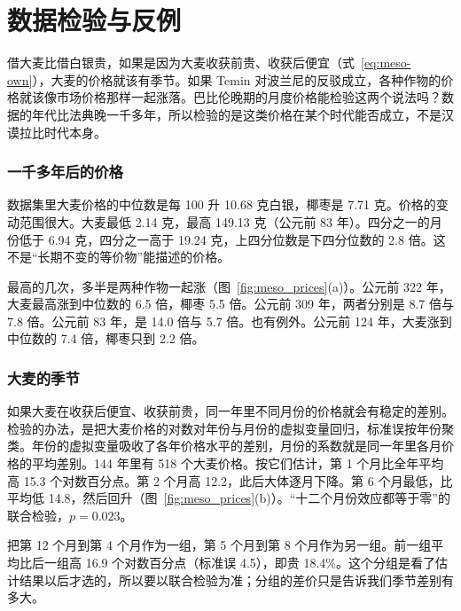 \section{数据检验与反例}\label{sec:meso-test}

借大麦比借白银贵，如果是因为大麦收获前贵、收获后便宜（式~\eqref{eq:meso-own}），大麦的价格就该有季节。如果 Temin 对波兰尼的反驳成立，各种作物的价格就该像市场价格那样一起涨落。巴比伦晚期的月度价格能检验这两个说法吗？数据的年代比法典晚一千多年，所以检验的是这类价格在某个时代能否成立，不是汉谟拉比时代本身。

\subsubsection{一千多年后的价格}
数据集里大麦价格的中位数是每 100 升 10.68 克白银，椰枣是 7.71 克。价格的变动范围很大。大麦最低 2.14 克，最高 149.13 克（公元前 83 年）。四分之一的月份低于 6.94 克，四分之一高于 19.24 克，上四分位数是下四分位数的 2.8 倍\cite{vdspek2014}。这不是“长期不变的等价物”能描述的价格。

最高的几次，多半是两种作物一起涨（图~\ref{fig:meso_prices}(a)）。公元前 322 年，大麦最高涨到中位数的 6.5 倍，椰枣 5.5 倍。公元前 309 年，两者分别是 8.7 倍与 7.8 倍。公元前 83 年，是 14.0 倍与 5.7 倍。也有例外。公元前 124 年，大麦涨到中位数的 7.4 倍，椰枣只到 2.2 倍。

\subsubsection{大麦的季节}
如果大麦在收获后便宜、收获前贵，同一年里不同月份的价格就会有稳定的差别。检验的办法，是把大麦价格的对数对年份与月份的虚拟变量回归，标准误按年份聚类。年份的虚拟变量吸收了各年价格水平的差别，月份的系数就是同一年里各月价格的平均差别。144 年里有 518 个大麦价格。按它们估计，第 1 个月比全年平均高 15.3 个对数百分点。第 2 个月高 12.2，此后大体逐月下降。第 6 个月最低，比平均低 14.8，然后回升（图~\ref{fig:meso_prices}(b)）。“十二个月份效应都等于零”的联合检验，$p=0.023$。

把第 12 个月到第 4 个月作为一组，第 5 个月到第 8 个月作为另一组。前一组平均比后一组高 16.9 个对数百分点（标准误 4.5），即贵 18.4\%。这个分组是看了估计结果以后才选的，所以要以联合检验为准；分组的差价只是告诉我们季节差别有多大。


